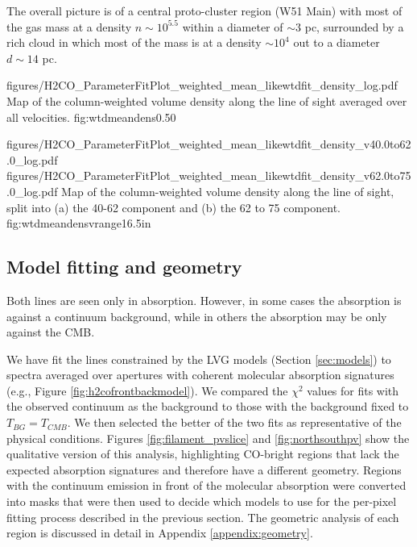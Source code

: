 The overall picture is of a central proto-cluster region (W51 Main) with most
of the gas mass at a density $n\sim10^{5.5}$ \percc within a diameter of
$\sim3$ pc, surrounded by a rich cloud in which most of the mass is at a
density $\sim10^4$ \percc out to a diameter $d\sim14$ pc.


\Figure
{figures/H2CO_ParameterFitPlot_weighted_mean_likewtdfit_density_log.pdf}
{Map of the column-weighted volume density along the line of sight averaged
over all velocities.  }
{fig:wtdmeandens}{0.5}{0}

\FigureTwoAA
{figures/H2CO_ParameterFitPlot_weighted_mean_likewtdfit_density_v40.0to62.0_log.pdf}
{figures/H2CO_ParameterFitPlot_weighted_mean_likewtdfit_density_v62.0to75.0_log.pdf}
{Map of the column-weighted volume density along the line of sight, split into 
(a) the 40-62 \kms component and (b) the 62 to 75 \kms component.}
{fig:wtdmeandensvrange}{1}{6.5in}

\subsection{Model fitting and geometry}
\label{sec:geometry}
Both \formaldehyde lines are seen only in absorption.  However, in some cases
the absorption is against a continuum background, while in others the
absorption may be only against the CMB.

We have fit the \formaldehyde lines constrained by the LVG models (Section
\ref{sec:models}) to spectra averaged over apertures with coherent molecular
absorption signatures (e.g., Figure \ref{fig:h2cofrontbackmodel}).  We compared
the $\chi^2$ values for fits with the observed continuum as the background to
those with the background fixed to $T_{BG} = T_{CMB}$.  We then selected the
better of the two fits as representative of the physical conditions.  Figures
\ref{fig:filament_pvslice} and \ref{fig:northsouthpv} show the qualitative
version of this analysis, highlighting CO-bright regions that lack the expected
\formaldehyde absorption signatures and therefore have a different geometry.
Regions with the continuum emission in front of the molecular absorption were
converted into masks that were then used to decide which models to use for the
per-pixel fitting process described in the previous section.  The geometric
analysis of each region is discussed in detail in Appendix
\ref{appendix:geometry}.

